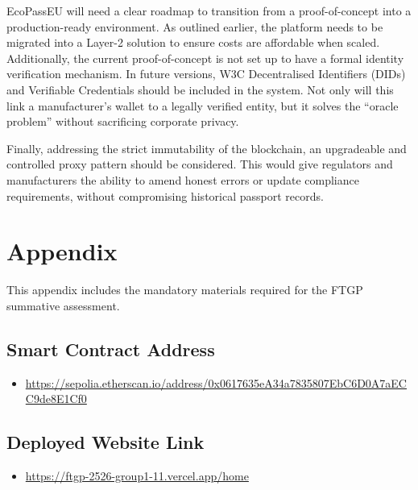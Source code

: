 \documentclass[runningheads]{llncs}
\begin{document}
	EcoPassEU will need a clear roadmap to transition from a proof-of-concept into a production-ready environment. As outlined earlier, the platform needs to be migrated into a Layer-2 solution to ensure costs are affordable when scaled. Additionally, the current proof-of-concept is not set up to have a formal identity verification mechanism. In future versions, W3C Decentralised Identifiers (DIDs) and 
	Verifiable Credentials \cite{W3C2025DID,W3C2025VC} should be included in the system. Not only will this link a manufacturer's wallet to a legally verified entity, but it solves the ``oracle problem'' without sacrificing corporate privacy.
	
	Finally, addressing the strict immutability of the blockchain, an upgradeable and controlled proxy pattern should be considered. This would give regulators and manufacturers the ability to amend honest errors or update compliance requirements, without compromising historical passport records.
	
	

	
	
	
	
	\newpage
	
	
	
	\newpage
	\appendix
	\section{Appendix}
	This appendix includes the mandatory materials required for the FTGP summative assessment.
	
	
	
	\subsection{Smart Contract Address}
	\begin{itemize}
		\item  \url{https://sepolia.etherscan.io/address/0x0617635eA34a7835807EbC6D0A7aECC9de8E1Cf0}
	\end{itemize}
	
	
	
	\subsection{Deployed Website Link}
	\begin{itemize}
		\item \url{https://ftgp-2526-group1-11.vercel.app/home}
    \end{itemize}
	
\end{document}
